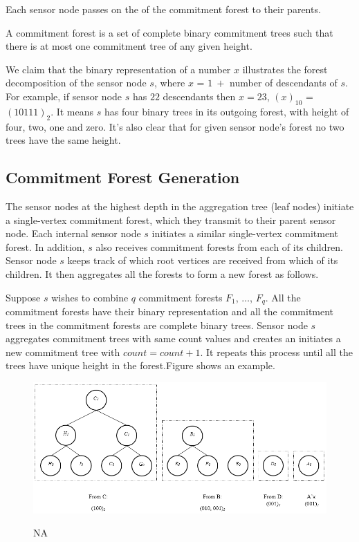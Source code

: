	Each sensor node passes on the \payloads of the commitment forest to their parents.

	\begin{definition}\cite{chan2006secure}
		A commitment forest is a set of complete binary commitment trees such that there is at most one commitment tree of any given height.
	\end{definition}

		We claim that the binary representation of a number $x$ illustrates the forest decomposition of the sensor node $s$, where $x$ = $1\ +$ number of descendants of $s$.
		For example, if sensor node $s$ has $22$ descendants then $x =23$, $(x)_{10}$ = $(10111)_{2}$. 
		It means $s$ has four binary trees in its outgoing forest, with height of four, two, one and zero. It's also clear that for given sensor node's forest no two trees have the same height.

	\subsection{Commitment Forest Generation}
		The sensor nodes at the highest depth in the aggregation tree (leaf nodes) initiate a single-vertex commitment forest, which they transmit to their parent sensor node.
		Each internal sensor node $s$ initiates a similar single-vertex commitment forest.
		In addition, $s$ also receives commitment forests from each of its children.
		Sensor node $s$ keeps track of which root vertices are received from which of its children.
		It then aggregates all the forests to form a new forest as follows.
		
		Suppose $s$ wishes to combine $q$ commitment forests $F_{1}$, $\dotsc$, $F_{q}$.
		All the commitment forests have their binary representation and all the commitment trees in the commitment forests are complete binary trees. 
		Sensor node $s$ aggregates commitment trees with same count values and creates an initiates a new commitment tree with $count = count + 1$. It repeats this process until all the trees have unique height in the forest.Figure shows an example.


	\newpage
	\begin{figure}[hp]
		\centering
		\includegraphics[scale = 0.7]{images/commitment-tree-example-1.png}\\
		\caption{NA}
	\end{figure}

